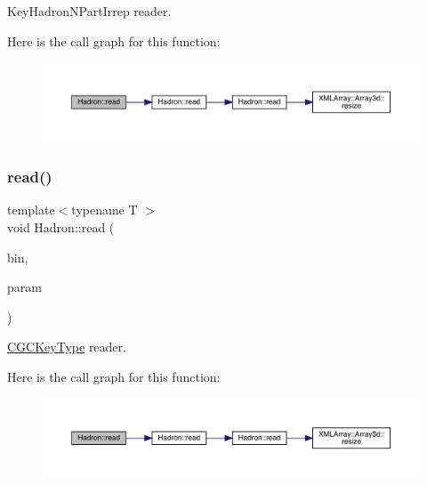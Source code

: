 Key\+Hadron\+N\+Part\+Irrep reader. 

Here is the call graph for this function\+:
\nopagebreak
\begin{figure}[H]
\begin{center}
\leavevmode
\includegraphics[width=350pt]{d1/daf/namespaceHadron_a9e39323c40f07b97b83923c9bfd452b3_cgraph}
\end{center}
\end{figure}
\mbox{\label{namespaceHadron_af29a7ca56e3472207899938a2a50babe}} 
\subsubsection{\texorpdfstring{read()}{read()}\hspace{0.1cm}{\footnotesize\ttfamily [10/94]}}
{\footnotesize\ttfamily template$<$typename T $>$ \\
void Hadron\+::read (\begin{DoxyParamCaption}\item[{\mbox{\hyperlink{classADATIO_1_1BinaryReader}{Binary\+Reader}} \&}]{bin,  }\item[{\mbox{\hyperlink{structHadron_1_1CGCKeyType}{C\+G\+C\+Key\+Type}}$<$ T $>$ \&}]{param }\end{DoxyParamCaption})\hspace{0.3cm}{\ttfamily [inline]}}



\mbox{\hyperlink{structHadron_1_1CGCKeyType}{C\+G\+C\+Key\+Type}} reader. 

Here is the call graph for this function\+:
\nopagebreak
\begin{figure}[H]
\begin{center}
\leavevmode
\includegraphics[width=350pt]{d1/daf/namespaceHadron_af29a7ca56e3472207899938a2a50babe_cgraph}
\end{center}
\end{figure}
\mbox{\label{namespaceHadron_a7f12085b340a6e0bfb52b3d920cfeb1e}} 
